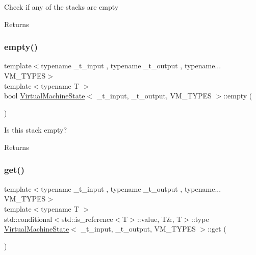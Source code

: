 Check if any of the stacks are empty \begin{DoxyReturn}{Returns}

\end{DoxyReturn}
\mbox{\label{class_virtual_machine_state_afd9734eba9ba7bb9bbf4926743c90a3a}} 
\subsubsection{\texorpdfstring{empty()}{empty()}}
{\footnotesize\ttfamily template$<$typename \+\_\+t\+\_\+input , typename \+\_\+t\+\_\+output , typename... V\+M\+\_\+\+T\+Y\+P\+ES$>$ \\
template$<$typename T $>$ \\
bool \hyperlink{class_virtual_machine_state}{Virtual\+Machine\+State}$<$ \+\_\+t\+\_\+input, \+\_\+t\+\_\+output, V\+M\+\_\+\+T\+Y\+P\+ES $>$\+::empty (\begin{DoxyParamCaption}{ }\end{DoxyParamCaption})\hspace{0.3cm}{\ttfamily [inline]}}

Is this stack empty? \begin{DoxyReturn}{Returns}

\end{DoxyReturn}
\mbox{\label{class_virtual_machine_state_a28d07f08745840f202822f02dee947ed}} 
\subsubsection{\texorpdfstring{get()}{get()}}
{\footnotesize\ttfamily template$<$typename \+\_\+t\+\_\+input , typename \+\_\+t\+\_\+output , typename... V\+M\+\_\+\+T\+Y\+P\+ES$>$ \\
template$<$typename T $>$ \\
std\+::conditional$<$std\+::is\+\_\+reference$<$T$>$\+::value, T\&, T$>$\+::type \hyperlink{class_virtual_machine_state}{Virtual\+Machine\+State}$<$ \+\_\+t\+\_\+input, \+\_\+t\+\_\+output, V\+M\+\_\+\+T\+Y\+P\+ES $>$\+::get (\begin{DoxyParamCaption}{ }\end{DoxyParamCaption})\hspace{0.3cm}{\ttfamily [inline]}}

